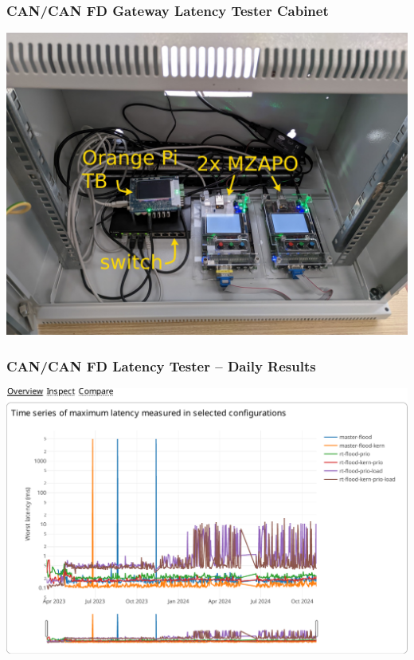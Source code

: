 \documentclass{beamer}
\begin{document}
\begin{frame}
\frametitle{CAN/CAN FD Gateway Latency Tester Cabinet}

  \centering

  \includegraphics[width=1.0\linewidth,height=0.87\textheight,clip=true,keepaspectratio]{fig/latester-cabinet3-crop.jpg}

\end{frame}

\begin{frame}\frametitle{CAN/CAN FD Latency Tester -- Daily Results}

  \centering

  \includegraphics[width=1.0\linewidth,height=0.85\textheight,clip=true,keepaspectratio]{fig/latester-overview-2024-10.pdf}

\end{frame}
\end{document}
